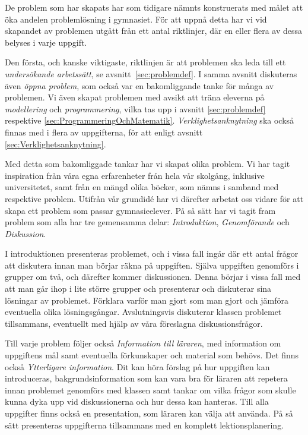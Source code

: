 
    \textcolor{lila}{De problem som har skapats har som tidigare nämnts konstruerats med målet att öka andelen problemlösning i gymnasiet. För att uppnå detta har vi vid skapandet av problemen utgått från ett antal riktlinjer, där en eller flera av dessa belyses i varje uppgift.}
    
    \textcolor{lila}{Den första, och kanske viktigaste, riktlinjen är att problemen ska leda till ett \textsl{undersökande arbetssätt}, se avsnitt~\ref{sec:problemdef}. I samma avsnitt diskuteras även \textsl{öppna problem}, som också var en bakomliggande tanke för många av problemen. Vi även skapat problemen med avsikt att träna eleverna på \textsl{modellering} och \textsl{programmering}, vilka tas upp i avsnitt \ref{sec:problemdef} respektive \ref{sec:ProgrammeringOchMatematik}. \textsl{Verklighetsanknytning} ska också finnas med i flera av uppgifterna, för att enligt avsnitt \ref{sec:Verklighetsanknytning}.}
    
    \textcolor{lila}{Med detta som bakomliggade tankar har vi skapat olika problem. Vi har tagit inspiration från våra egna erfarenheter från hela vår skolgång, inklusive universitetet, samt från en mängd olika böcker, som nämns i samband med respektive problem. Utifrån vår grundidé har vi därefter arbetat oss vidare för att skapa ett problem som passar gymnasieelever. På så sätt har vi tagit fram problem som alla har tre gemensamma delar: \textsl{Introduktion}, \textsl{Genomförande} och \textsl{Diskussion}.}
    
    \textcolor{lila}{I introduktionen presenteras problemet, och i vissa fall ingår där ett antal frågor att diskutera innan man börjar räkna på uppgiften. Själva uppgiften genomförs i grupper om två, och därefter kommer diskussionen. Denna börjar i vissa fall med att man går ihop i lite större grupper och presenterar och diskuterar sina lösningar av problemet. Förklara varför man gjort som man gjort och jämföra eventuella olika lösningsgångar. Avslutningsvis diskuterar klassen problemet tillsammans, eventuellt med hjälp av våra föreslagna diskussionsfrågor.} 
    
    \textcolor{lila}{Till varje problem följer också \textsl{Information till läraren}, med information om uppgiftens mål samt eventuella förkunskaper och material som behövs. Det finns också \textsl{Ytterligare information}. Dit kan höra förslag på hur uppgiften kan introduceras, bakgrundsinformation som kan vara bra för läraren att repetera innan problemet genomförs med klassen samt tankar om vilka frågor som skulle kunna dyka upp vid diskussionerna och hur dessa kan hanteras. Till alla uppgifter finns också en presentation, som läraren kan välja att använda. På så sätt presenteras uppgifterna tillsammans med en komplett lektionsplanering.}
    

